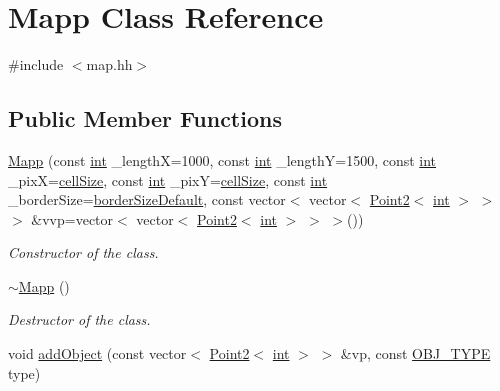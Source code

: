 \hypertarget{class_mapp}{}\section{Mapp Class Reference}
\label{class_mapp}


{\ttfamily \#include $<$map.\+hh$>$}

\subsection*{Public Member Functions}
\begin{DoxyCompactItemize}
\item 
\mbox{\hyperlink{class_mapp_a748ffcb20519591210f19458c90f482a}{Mapp}} (const \mbox{\hyperlink{draw_8hh_aa620a13339ac3a1177c86edc549fda9b}{int}} \+\_\+lengthX=1000, const \mbox{\hyperlink{draw_8hh_aa620a13339ac3a1177c86edc549fda9b}{int}} \+\_\+lengthY=1500, const \mbox{\hyperlink{draw_8hh_aa620a13339ac3a1177c86edc549fda9b}{int}} \+\_\+pixX=\mbox{\hyperlink{class_mapp_a8216044ff8e95ba054985e26ae1c75f8}{cell\+Size}}, const \mbox{\hyperlink{draw_8hh_aa620a13339ac3a1177c86edc549fda9b}{int}} \+\_\+pixY=\mbox{\hyperlink{class_mapp_a8216044ff8e95ba054985e26ae1c75f8}{cell\+Size}}, const \mbox{\hyperlink{draw_8hh_aa620a13339ac3a1177c86edc549fda9b}{int}} \+\_\+border\+Size=\mbox{\hyperlink{class_mapp_aef8bde83114714a4ce4ad9d13766e761}{border\+Size\+Default}}, const vector$<$ vector$<$ \mbox{\hyperlink{class_point2}{Point2}}$<$ \mbox{\hyperlink{draw_8hh_aa620a13339ac3a1177c86edc549fda9b}{int}} $>$ $>$ $>$ \&vvp=vector$<$ vector$<$ \mbox{\hyperlink{class_point2}{Point2}}$<$ \mbox{\hyperlink{draw_8hh_aa620a13339ac3a1177c86edc549fda9b}{int}} $>$ $>$ $>$())
\begin{DoxyCompactList}\small\item\em Constructor of the class. \end{DoxyCompactList}\item 
\mbox{\hyperlink{class_mapp_ac213a283850079e3facfae146fc22b8b}{$\sim$\+Mapp}} ()
\begin{DoxyCompactList}\small\item\em Destructor of the class. \end{DoxyCompactList}\item 
void \mbox{\hyperlink{class_mapp_ad480beefb37fe0e3cab870fea0a4a1f7}{add\+Object}} (const vector$<$ \mbox{\hyperlink{class_point2}{Point2}}$<$ \mbox{\hyperlink{draw_8hh_aa620a13339ac3a1177c86edc549fda9b}{int}} $>$ $>$ \&vp, const \mbox{\hyperlink{map_8hh_a714b9c2c276fbae637fee36453d9121e}{O\+B\+J\+\_\+\+T\+Y\+PE}} type)

\end{DoxyCompactItemize}
